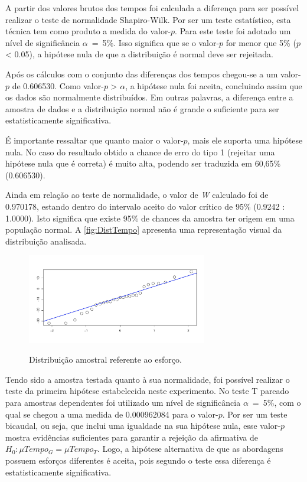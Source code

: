 A partir dos valores brutos dos tempos foi calculada a diferença para ser possível realizar o teste de normalidade Shapiro-Wilk.
Por ser um teste estatístico, esta técnica tem como produto a medida do valor-$p$.
Para este teste foi adotado um nível de significância $\alpha$~=~5\%. 
Isso significa que se o valor-$p$ for menor que 5\% ($p$ < 0.05), a hipótese nula de que a distribuição é normal deve ser rejeitada.

Após os cálculos com o conjunto das diferenças dos tempos chegou-se a um valor-$p$ de 0.606530.
Como valor-$p$ > $\alpha$, a hipótese nula foi aceita, concluindo assim que os dados são normalmente distribuídos.
Em outras palavras, a diferença entre a amostra de dados e a distribuição normal não é grande o suficiente para ser estatisticamente significativa.

É importante ressaltar que quanto maior o valor-$p$, mais ele suporta uma hipótese nula. 
No caso do resultado obtido a chance de erro do tipo 1 (rejeitar uma hipótese nula que é correta) é muito alta, podendo ser traduzida em 60,65\% (0.606530).

Ainda em relação ao teste de normalidade, o valor de \textit{W} calculado foi de 0.970178, estando dentro do intervalo aceito do valor crítico de 95\% (0.9242 : 1.0000). 
Isto significa que existe 95\% de chances da amostra ter origem em uma população normal.
A \autoref{fig:DistTempo} apresenta uma representação visual da distribuição analisada.

\begin{figure}[!htb]
    \centering
    \caption{Distribuição amostral referente ao esforço.}
    \includegraphics[width=0.7\textwidth]{ResultsExp/DistribuicaoAmostraTempo}
    \label{fig:DistTempo}
\end{figure}

Tendo sido a amostra testada quanto à sua normalidade, foi possível realizar o teste da primeira hipótese estabelecida neste experimento. 
No teste T pareado para amostras dependentes foi utilizado um nível de significância $\alpha$~=~5\%, com o qual se chegou a uma medida de 0.000962084 para o valor-$p$. 
Por ser um teste bicaudal, ou seja, que inclui uma igualdade na sua hipótese nula, esse valor-$p$ mostra evidências suficientes para garantir a rejeição da afirmativa de $H_0 : \mu Tempo_G = \mu Tempo_T$.
Logo, a hipótese alternativa de que as abordagens possuem esforços diferentes é aceita, pois segundo o teste essa diferença é estatisticamente significativa.

